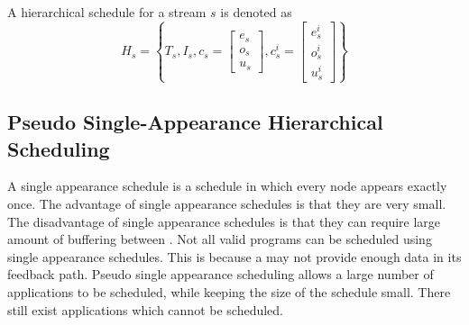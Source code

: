 A hierarchical schedule for a stream $s$ is denoted as $$H_s =
\left\{T_s, I_s, c_s = \left[\begin{array}{c}
e_s\\o_s\\u_s\end{array}\right], c^i_s =
\left[\begin{array}{c}e^i_s\\o^i_s\\u^i_s\end{array}\right]\right\}$$

\subsection{Pseudo Single-Appearance Hierarchical Scheduling}
\label{sec:sas}

\begin{comment}
\begin{figure}
\begin{minipage}{1.5in}
\centering \psfig{figure=pipeline-steady-state.eps,width=0.6in} \\
{\protect\small (a) A sample {\pipeline}}
\end{minipage}
~
\begin{minipage}{1.5in}
\centering \psfig{figure=splitjoin-steady-state.eps,width=1.2in} \\
{\protect\small (b) A sample {\splitjoin}}
\end{minipage}
~
\begin{minipage}{2.5in}
\centering \psfig{figure=feedback-hierarchical.eps,width=1.0in} \\
{\protect\small (c) A sample {{\feedbackloop}}.\\ $delay_{fl} = 15$ \\
The $L$ {\filter} has been flipped upside-down for clarity. \\$e_L
= 9, o_L = 5, u_L = 6$ }
\end{minipage}
\caption{Sample {\StreamIt} streams used for Pseudo
Single-Appearance Hierarchical Scheduling}
\label{fig:hierarchical-schedule}
\end{figure}
\end{comment}

A single appearance schedule is a schedule in which every node
appears exactly once. The advantage of single appearance schedules
is that they are very small. The disadvantage of single appearance
schedules is that they can require large amount of buffering
between {\filters}. Not all valid {\StreamIt} programs can be
scheduled using single appearance schedules. This is because a
{\feedbackloop} may not provide enough data in its feedback path.
Pseudo single appearance scheduling allows a large number of
applications to be scheduled, while keeping the size of the
schedule small. There still exist applications which cannot be
scheduled.

